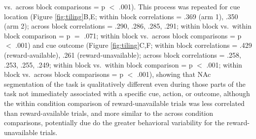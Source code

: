 \documentclass[11pt]{article}
\begin{document}
vs.\ across block comparisons = p $<$ .001). This process was repeated
for cue location (Figure \ref{fig:tiling}B,E; within block
correlations = .369 (arm 1), .350 (arm 2); across block correlations =
.290, .286, .285, .291; within block vs.\ within block comparison = p
$=$ .071; within block vs.\ across block comparisons = p $<$ .001) and
cue outcome (Figure \ref{fig:tiling}C,F; within block correlations =
.429 (reward-available), .261 (reward-unavailable); across block
correlations = .258, .253, .255, .249; within block vs.\ within block
comparison = p $<$ .001; within block vs.\ across block comparisons =
p $<$ .001), showing that NAc segmentation of the task is
qualitatively different even during those parts of the task not
immediately associated with a specific cue, action, or outcome,
although the within condition comparison of reward-unavailable trials
was less correlated than reward-available trials, and more similar to
the across condition comparisons, potentially due do the greater
behavioral variability for the reward-unavailable trials.
\end{document}
